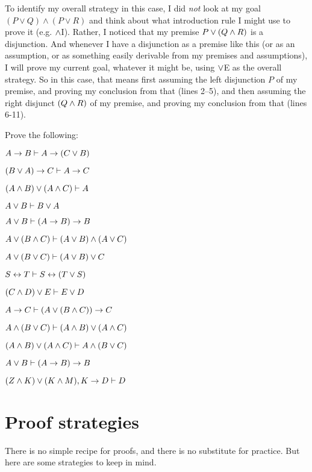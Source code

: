 To identify my overall strategy in this case, I did \emph{not} look at my goal $(P\lor Q)\land (P\lor R)$ and think about what introduction rule I might use to prove it (e.g. $\wedge$I).  Rather, I noticed that my premise $P \vee (Q \wedge R)$ is a disjunction.  And whenever I have a disjunction as a premise like this (or as an assumption, or as something easily derivable from my premises and assumptions), I will prove my current goal, whatever it might be, using $\vee$E as the overall strategy. So in this case, that means first assuming the left disjunction $P$ of my premise, and proving my conclusion from that (lines 2--5), and then assuming the right disjunct $(Q \wedge R)$ of my premise, and proving my conclusion from that (lines 6-11).



\practiceproblems

\problempart
Prove the following:

\begin{earg}
\item $A \rightarrow B \vdash A \rightarrow (C \vee B)$
\item $(B \vee A) \rightarrow C \vdash A \rightarrow C$
\item $(A \wedge B) \vee (A \wedge C) \vdash A$
\item $A \vee B \vdash B \vee A$
\item  $A \vee B \vdash (A\rightarrow B) \rightarrow B$ 
\item $A \vee (B \wedge C) \vdash (A \vee B) \wedge (A \vee C)$
\item $A \vee (B \vee C) \vdash (A \vee B) \vee C$
\item $S\leftrightarrow T \vdash S\leftrightarrow (T\vee S)$
\item $(C\wedge D)\vee E \vdash E\vee D$
\item $A \rightarrow  C \vdash (A \vee (B \wedge C)) \rightarrow C$ 
\item $ A \wedge (B \vee C) \vdash (A \wedge B) \vee (A \wedge C)$
\item $  (A \wedge B) \vee (A \wedge C) \vdash  A \wedge (B \vee C)$
\item $A \vee B \vdash (A \rightarrow B) \rightarrow B$
\item $(Z\wedge K) \vee (K\wedge M), K \rightarrow D \vdash D$
\end{earg}



\section{Proof strategies}\label{s:ProofStrategies}
There is no simple recipe for proofs, and there is no substitute for practice. But here are some strategies to keep in mind.

